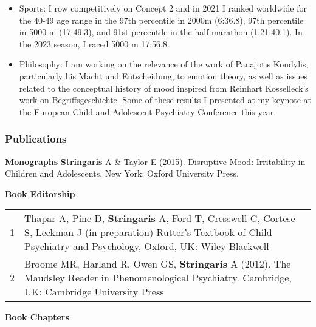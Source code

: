 \documentclass[
]{article}
\begin{document}
\begin{itemize}
\item
  Sports: I row competitively on Concept 2 and in 2021 I ranked
  worldwide for the 40-49 age range in the 97th percentile in 2000m
  (6:36.8), 97th percentile in 5000 m (17:49.3), and 91st percentile in
  the half marathon (1:21:40.1). In the 2023 season, I raced 5000 m
  17:56.8.
\item
  Philosophy: I am working on the relevance of the work of Panajotis
  Kondylis, particularly his Macht und Entscheidung, to emotion theory,
  as well as issues related to the conceptual history of mood inspired
  from Reinhart Kosselleck's work on Begriffsgeschichte. Some of these
  results I presented at my keynote at the European Child and Adolescent
  Psychiatry Conference this year.
\end{itemize}

\hypertarget{publications}{%
\subsubsection{Publications}\label{publications}}

\textbf{Monographs} \textbf{Stringaris} A \& Taylor E (2015). Disruptive
Mood: Irritability in Children and Adolescents. New York: Oxford
University Press.

\textbf{Book Editorship}

\begin{longtable}[]{@{}rl@{}}
\toprule
\endhead
1 & Thapar A, Pine D, \textbf{Stringaris} A, Ford T, Cresswell C,
Cortese S, Leckman J (in preparation) Rutter's Textbook of Child
Psychiatry and Psychology, Oxford, UK: Wiley Blackwell\tabularnewline
2 & Broome MR, Harland R, Owen GS, \textbf{Stringaris} A (2012). The
Maudsley Reader in Phenomenological Psychiatry. Cambridge, UK: Cambridge
University Press\tabularnewline
\bottomrule
\end{longtable}

\textbf{Book Chapters}
\end{document}
